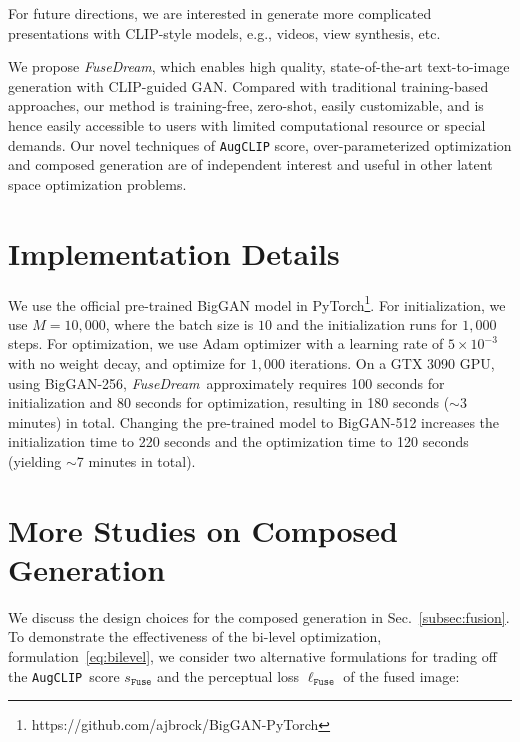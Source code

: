 \documentclass[10pt,twocolumn,letterpaper]{article}
\newcommand{\our}{\emph{FuseDream}}
\newcommand{\ourloss}{\texttt{AugCLIP}}
\begin{document}
For future directions, 
we are interested in generate more complicated presentations with CLIP-style models, e.g., videos, view synthesis, etc.
\fi

We propose {\our}, which enables high quality, state-of-the-art text-to-image generation with CLIP-guided GAN. 
Compared with traditional training-based approaches, 
our method is training-free, zero-shot, easily customizable, and is hence 
easily accessible to users with limited computational resource or special demands. 
Our novel techniques of {\ourloss} score, over-parameterized optimization and composed generation are of independent interest and useful in other latent space optimization problems.  


\newpage
{\small


}

\clearpage
\appendix
\onecolumn
\section{Implementation Details}
We use the official pre-trained BigGAN model in PyTorch\footnote{https://github.com/ajbrock/BigGAN-PyTorch}. For initialization, we use $M=10,000$, where the batch size is $10$ and the initialization runs for $1,000$ steps. For optimization, we use Adam optimizer with a learning rate of $5\times10^{-3}$ with no weight decay, and optimize for $1,000$ iterations. On a GTX 3090 GPU, using BigGAN-256, \our~approximately requires 100 seconds for initialization and 80 seconds for optimization, resulting in 180 seconds ($\sim$3 minutes) in total. Changing the pre-trained model to BigGAN-512  increases the initialization time to 220 seconds and the optimization time to 120 seconds (yielding $\sim$7 minutes in total). 

\section{More Studies on Composed Generation}
We discuss the design choices for the composed generation in Sec.~\ref{subsec:fusion}. 
To demonstrate the effectiveness of the bi-level optimization,  formulation~\eqref{eq:bilevel}, 
we consider 
two alternative formulations
for trading off the \ourloss~score $s_{\texttt{Fuse}}$ and the perceptual loss $\ell_{\texttt{Fuse}}$  of the fused image:  \vspace{.5\baselineskip}
\end{document}

